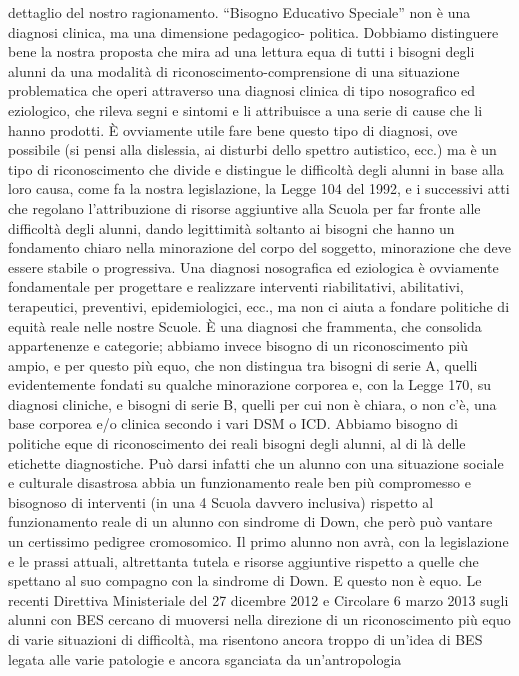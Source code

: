 dettaglio del nostro ragionamento.
“Bisogno Educativo Speciale” non è una diagnosi clinica, ma una dimensione pedagogico-
politica.
Dobbiamo distinguere bene la nostra proposta che mira ad una lettura equa di tutti i bisogni
degli alunni da una modalità di riconoscimento-comprensione di una situazione problematica che
operi attraverso una diagnosi clinica di tipo nosografico ed eziologico, che rileva segni e sintomi e li
attribuisce a una serie di cause che li hanno prodotti. È ovviamente utile fare bene questo tipo di
diagnosi, ove possibile (si pensi alla dislessia, ai disturbi dello spettro autistico, ecc.) ma è un tipo
di riconoscimento che divide e distingue le difficoltà degli alunni in base alla loro causa, come fa la
nostra legislazione, la Legge 104 del 1992, e i successivi atti che regolano l’attribuzione di risorse
aggiuntive alla Scuola per far fronte alle difficoltà degli alunni, dando legittimità soltanto ai bisogni
che hanno un fondamento chiaro nella minorazione del corpo del soggetto, minorazione che deve
essere stabile o progressiva.
Una diagnosi nosografica ed eziologica è ovviamente fondamentale per progettare e realizzare
interventi riabilitativi, abilitativi, terapeutici, preventivi, epidemiologici, ecc., ma non ci aiuta a
fondare politiche di equità reale nelle nostre Scuole. È una diagnosi che frammenta, che consolida
appartenenze e categorie; abbiamo invece bisogno di un riconoscimento più ampio, e per questo
più equo, che non distingua tra bisogni di serie A, quelli evidentemente fondati su qualche
minorazione corporea e, con la Legge 170, su diagnosi cliniche, e bisogni di serie B, quelli per cui
non è chiara, o non c’è, una base corporea e/o clinica secondo i vari DSM o ICD.
Abbiamo bisogno di politiche eque di riconoscimento dei reali bisogni degli alunni, al di là
delle etichette diagnostiche. Può darsi infatti che un alunno con una situazione sociale e culturale
disastrosa abbia un funzionamento reale ben più compromesso e bisognoso di interventi (in una
4
Scuola davvero inclusiva) rispetto al funzionamento reale di un alunno con sindrome di Down, che
però può vantare un certissimo pedigree cromosomico. Il primo alunno non avrà, con la
legislazione e le prassi attuali, altrettanta tutela e risorse aggiuntive rispetto a quelle che spettano
al suo compagno con la sindrome di Down. E questo non è equo. Le recenti Direttiva Ministeriale
del 27 dicembre 2012 e Circolare 6 marzo 2013 sugli alunni con BES cercano di muoversi nella
direzione di un riconoscimento più equo di varie situazioni di difficoltà, ma risentono ancora
troppo di un'idea di BES legata alle varie patologie e ancora sganciata da un'antropologia
